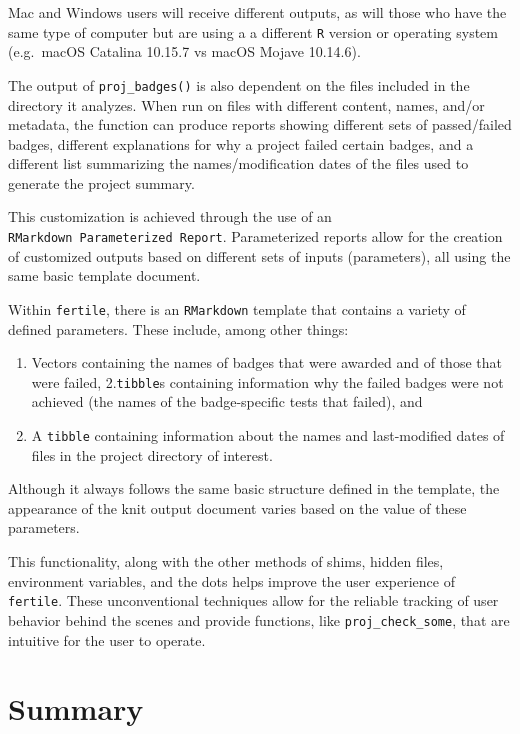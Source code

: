 \documentclass[12pt,twoside]{reedthesis}
\providecommand{\tightlist}{%
  \setlength{\itemsep}{0pt}\setlength{\parskip}{0pt}}
\begin{document}
Mac and Windows users will receive different outputs, as will those who have the same type of computer but are using a a different \texttt{R} version or operating system (e.g.~macOS Catalina 10.15.7 vs macOS Mojave 10.14.6).

The output of \texttt{proj\_badges()} is also dependent on the files included in the directory it analyzes. When run on files with different content, names, and/or metadata, the function can produce reports showing different sets of passed/failed badges, different explanations for why a project failed certain badges, and a different list summarizing the names/modification dates of the files used to generate the project summary.

This customization is achieved through the use of an \texttt{RMarkdown\ Parameterized\ Report}. Parameterized reports allow for the creation of customized outputs based on different sets of inputs (parameters), all using the same basic template document.

Within \texttt{fertile}, there is an \texttt{RMarkdown} template that contains a variety of defined parameters. These include, among other things:
\begin{enumerate}
\def\labelenumi{\arabic{enumi}.}
\tightlist
\item
  Vectors containing the names of badges that were awarded and of those that were failed,
  2.\texttt{tibble}s containing information why the failed badges were not achieved (the names of the badge-specific tests that failed), and
\item
  A \texttt{tibble} containing information about the names and last-modified dates of files in the project directory of interest.
\end{enumerate}
Although it always follows the same basic structure defined in the template, the appearance of the knit output document varies based on the value of these parameters.

This functionality, along with the other methods of shims, hidden files, environment variables, and the dots helps improve the user experience of \texttt{fertile}. These unconventional techniques allow for the reliable tracking of user behavior behind the scenes and provide functions, like \texttt{proj\_check\_some}, that are intuitive for the user to operate.

\hypertarget{summary}{%
\section{Summary}\label{summary}}
\end{document}
